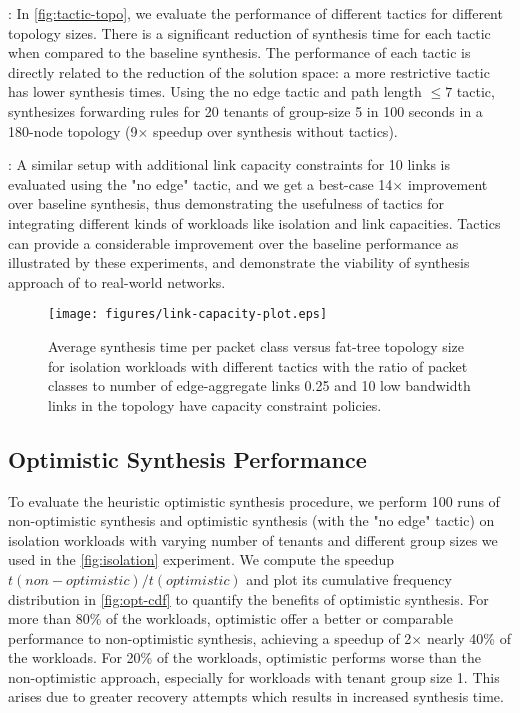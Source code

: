 : 
In \cref{fig:tactic-topo},
 we evaluate the performance of different tactics for different topology sizes. There is a
 significant reduction of synthesis time for each tactic when compared to the baseline synthesis.
 The performance of each tactic is directly related to the reduction of the solution space: a more
 restrictive tactic has lower synthesis times. 
  Using the no edge tactic
 and path length $\leq 7$ tactic, \Name synthesizes forwarding rules for 20 tenants of group-size 5 in 100 seconds in a 180-node
 topology (9$\times$ speedup over synthesis without tactics).
  
  : 
 A similar setup with additional link capacity 
 constraints for 10 links is evaluated using the "no edge" tactic, and we get a best-case 14$\times$
 improvement over baseline synthesis, thus demonstrating the usefulness of tactics for 
 integrating different kinds of workloads like isolation and link capacities. 
 Tactics can provide 
 a considerable improvement over the baseline performance as illustrated by these experiments,
 and demonstrate the viability of synthesis approach of \Name to real-world networks.  
 
\begin{figure}[h]
	\texttt{[image: figures/link-capacity-plot.eps]}
	\caption{Average synthesis time per packet class versus fat-tree topology size for isolation workloads 
		with different tactics with the ratio of packet classes to number of edge-aggregate links 0.25 and 10 low bandwidth links in the topology 
		have capacity constraint policies.}
	\label{fig:link-capacity}
\end{figure}


\subsection{Optimistic Synthesis Performance} \label{sec:optimisticeval}
To evaluate the heuristic optimistic synthesis procedure, we perform 100 runs of non-optimistic
 synthesis and optimistic synthesis (with the "no edge" tactic) on isolation
 workloads with varying number of tenants and different group sizes 
we used in the \cref{fig:isolation} experiment. We compute the
 speedup $t(non-optimistic)/t(optimistic)$ and plot its cumulative frequency
  distribution in \cref{fig:opt-cdf} to quantify the benefits of optimistic 
  synthesis. For more than 80\% of the
workloads, optimistic offer a better or comparable performance to non-optimistic synthesis, 
achieving a speedup of 2$\times$ nearly 40\% of the workloads. For 20\% of the workloads, optimistic
performs worse than the non-optimistic approach, especially for workloads with tenant group size 1. 
This arises due to greater recovery attempts which results in increased synthesis time. 

